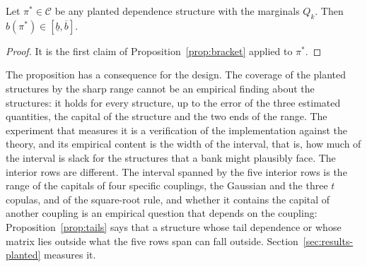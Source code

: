 \begin{proposition}
\label{prop:coverage}
Let $\pi^\ast\in\mathcal C$ be any planted dependence structure with the marginals $Q_k$. Then $b(\pi^\ast)\in[\underline b,\overline b]$.
\end{proposition}

\begin{proof}
It is the first claim of Proposition~\ref{prop:bracket} applied to $\pi^\ast$.
\end{proof}

The proposition has a consequence for the design. The coverage of the planted structures by the sharp range cannot be an
empirical finding about the structures: it holds for every structure, up to the error of the three estimated quantities, the
capital of the structure and the two ends of the range. The experiment that measures it is a verification of the implementation
against the theory, and its empirical content is the width of the interval, that is, how much of the interval is slack for the
structures that a bank might plausibly face. The interior rows are different. The interval spanned by the five interior rows is the
range of the capitals of four specific couplings, the Gaussian and the three $t$ copulas, and of the square-root rule, and whether it contains the capital of another coupling is an empirical question
that depends on the coupling: Proposition~\ref{prop:tails} says that a structure whose tail dependence or whose matrix lies outside
what the five rows span can fall outside. Section~\ref{sec:results-planted} measures it.
